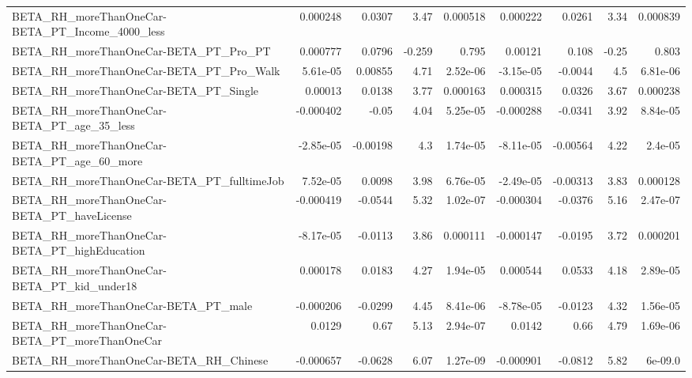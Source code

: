 \begin{tabular}{lrrrrrrrr}
BETA\_RH\_moreThanOneCar-BETA\_PT\_Income\_4000\_less    &    0.000248 &       0.0307 &      3.47 & 0.000518 &   0.000222 &      0.0261 &         3.34 &      0.000839 \\
BETA\_RH\_moreThanOneCar-BETA\_PT\_Pro\_PT              &    0.000777 &       0.0796 &    -0.259 &    0.795 &    0.00121 &       0.108 &        -0.25 &         0.803 \\
BETA\_RH\_moreThanOneCar-BETA\_PT\_Pro\_Walk            &    5.61e-05 &      0.00855 &      4.71 & 2.52e-06 &  -3.15e-05 &     -0.0044 &          4.5 &      6.81e-06 \\
BETA\_RH\_moreThanOneCar-BETA\_PT\_Single              &     0.00013 &       0.0138 &      3.77 & 0.000163 &   0.000315 &      0.0326 &         3.67 &      0.000238 \\
BETA\_RH\_moreThanOneCar-BETA\_PT\_age\_35\_less         &   -0.000402 &        -0.05 &      4.04 & 5.25e-05 &  -0.000288 &     -0.0341 &         3.92 &      8.84e-05 \\
BETA\_RH\_moreThanOneCar-BETA\_PT\_age\_60\_more         &   -2.85e-05 &     -0.00198 &       4.3 & 1.74e-05 &  -8.11e-05 &    -0.00564 &         4.22 &       2.4e-05 \\
BETA\_RH\_moreThanOneCar-BETA\_PT\_fulltimeJob         &    7.52e-05 &       0.0098 &      3.98 & 6.76e-05 &  -2.49e-05 &    -0.00313 &         3.83 &      0.000128 \\
BETA\_RH\_moreThanOneCar-BETA\_PT\_haveLicense         &   -0.000419 &      -0.0544 &      5.32 & 1.02e-07 &  -0.000304 &     -0.0376 &         5.16 &      2.47e-07 \\
BETA\_RH\_moreThanOneCar-BETA\_PT\_highEducation       &   -8.17e-05 &      -0.0113 &      3.86 & 0.000111 &  -0.000147 &     -0.0195 &         3.72 &      0.000201 \\
BETA\_RH\_moreThanOneCar-BETA\_PT\_kid\_under18         &    0.000178 &       0.0183 &      4.27 & 1.94e-05 &   0.000544 &      0.0533 &         4.18 &      2.89e-05 \\
BETA\_RH\_moreThanOneCar-BETA\_PT\_male                &   -0.000206 &      -0.0299 &      4.45 & 8.41e-06 &  -8.78e-05 &     -0.0123 &         4.32 &      1.56e-05 \\
BETA\_RH\_moreThanOneCar-BETA\_PT\_moreThanOneCar      &      0.0129 &         0.67 &      5.13 & 2.94e-07 &     0.0142 &        0.66 &         4.79 &      1.69e-06 \\
BETA\_RH\_moreThanOneCar-BETA\_RH\_Chinese             &   -0.000657 &      -0.0628 &      6.07 & 1.27e-09 &  -0.000901 &     -0.0812 &         5.82 &       6e-09.0 \\

\end{tabular}
